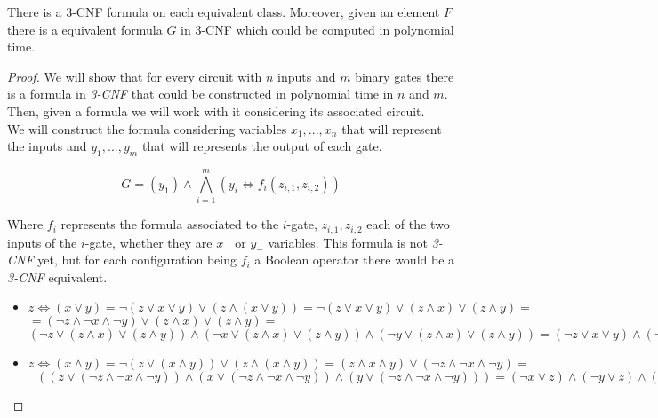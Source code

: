   \begin{theorem} \label{the:Tseitin}
    There is a 3-CNF formula on each equivalent class. Moreover, given an element $F$  there is a equivalent formula $G$  in 3-CNF which could be computed in polynomial time. 
  \end{theorem}

  \begin{proof}
    We will show that for every circuit with $n$ inputs and $m$ binary gates there is a formula in \emph{3-CNF}  that could be constructed in polynomial time in $n$ and $m$. Then, given a formula we will work with it considering its associated circuit.\\
    
    We will construct the formula considering variables $x_1,...,x_n$ that will represent the inputs and $y_1,...,y_m$ that will represents the output of each gate. 

    $$ G = (y_1) \wedge \bigwedge_{i=1}^m (y_i \iff f_i(z_{i,1},z_{i,2}))$$

    Where $f_i$ represents the formula associated to the $i$-gate, $z_{i,1},z_{i,2}$ each of the two inputs of the $i$-gate, whether they are $x_-$ or $y_-$ variables. This formula is not \emph{3-CNF} yet, but for each configuration being $f_i$ a Boolean operator there would be a \emph{3-CNF} equivalent.

    \begin{itemize}
    \item $z \iff( x \vee y )  = \neg  ( z \vee  x \vee y    ) \vee (z \wedge ( x \vee y )  ) = \neg  ( z \vee  x \vee y    ) \vee (z \wedge x)  \vee (z \wedge y ) =$\\$= ( \neg  z \wedge  \neg  x \wedge \neg   y    ) \vee (z \wedge x)  \vee (z \wedge y )  =$$
      (\neg  z \vee (z \wedge x)  \vee (z \wedge y ))  \wedge  
      (\neg  x \vee (z \wedge x)  \vee (z \wedge y )) \wedge
      (\neg  y \vee (z \wedge x)  \vee (z \wedge y ))   =
      (\neg  z \vee x  \vee y )  \wedge  
      (\neg  x \vee z  ) \wedge
      (\neg  y \vee z ) $   
    \item $z \iff( x \wedge y ) = \neg ( z \vee ( x \wedge y )) \vee (z \wedge ( x \wedge y )) = (z\wedge x \wedge y ) \vee  (\neg  z\wedge \neg  x \wedge \neg  y )  =$\\$\ \ \ ((z\vee  (\neg  z\wedge \neg  x \wedge \neg  y )  ) \wedge (x \vee  (\neg  z\wedge \neg  x \wedge \neg  y )  ) \wedge (y\vee  (\neg  z\wedge \neg  x \wedge \neg  y )  ) ) = (\neg  x \vee z) \wedge (\neg  y \vee z ) \wedge (\neg  z \vee x ) \wedge (\neg  y \vee x ) \wedge(\neg  z\vee y )\wedge (\neg  x\vee y )$
      

\end{itemize}
\end{proof}
